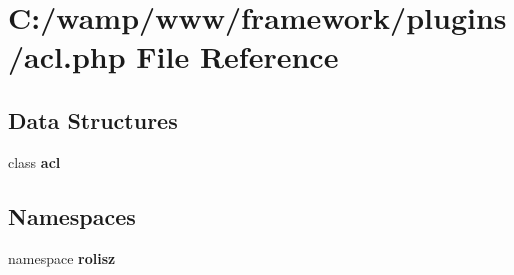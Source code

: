 \section{C:/wamp/www/framework/plugins/acl.php File Reference}
\label{acl_8php}
\subsection*{Data Structures}
\begin{DoxyCompactItemize}
\item 
class {\bf acl}
\end{DoxyCompactItemize}
\subsection*{Namespaces}
\begin{DoxyCompactItemize}
\item 
namespace {\bf rolisz}
\end{DoxyCompactItemize}
